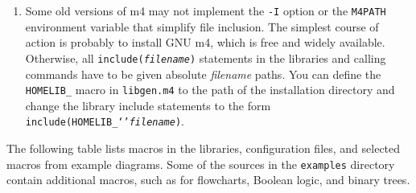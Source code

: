 \begin{enumerate}

\item
{}\label{Mfourerror:}
  Some old versions of m4 may not implement
  the {\tt -I} option or the {\tt M4PATH} environment variable that
  simplify file inclusion.
  The simplest course of action is probably to install GNU m4, which is
  free and widely available. 
  Otherwise, all {\tt include({\sl filename})} statements in the libraries and
  calling commands have to be given absolute {\sl filename} paths. 
  You can define the {\tt HOMELIB\_} macro in {\tt libgen.m4} to the
  path of the installation directory and change the library
  include statements to the form {\tt include(HOMELIB\_`'{\sl filename})}.

\end{enumerate}

\label{defines}
The following table lists macros in the libraries, configuration
files, and selected macros from example diagrams.  Some of the sources
in the {\tt examples} directory contain
additional macros, such as for flowcharts, Boolean logic, and binary
trees.

